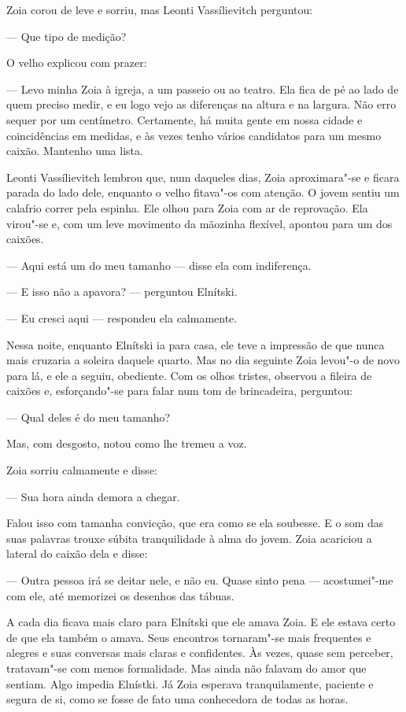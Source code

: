 Zoia corou de leve e sorriu, mas Leonti Vassílievitch perguntou:

--- Que tipo de medição?

O velho explicou com prazer:

--- Levo minha Zoia à igreja, a um passeio ou ao teatro. Ela fica de pé
ao lado de quem preciso medir, e eu logo vejo as diferenças na altura e
na largura. Não erro sequer por um centímetro. Certamente, há muita
gente em nossa cidade e coincidências em medidas, e às vezes tenho
vários candidatos para um mesmo caixão. Mantenho uma lista.

Leonti Vassílievitch lembrou que, num daqueles dias, Zoia aproximara"-se
e ficara parada do lado dele, enquanto o velho fitava"-os com atenção. O
jovem sentiu um calafrio correr pela espinha. Ele olhou para Zoia com ar
de reprovação. Ela virou"-se e, com um leve movimento da mãozinha
flexível, apontou para um dos caixões.

--- Aqui está um do meu tamanho --- disse ela com indiferença.

--- E isso não a apavora? --- perguntou Elnítski.

--- Eu cresci aqui --- respondeu ela calmamente.

Nessa noite, enquanto Elnítski ia para casa, ele teve a impressão de que
nunca mais cruzaria a soleira daquele quarto. Mas no dia seguinte Zoia
levou"-o de novo para lá, e ele a seguiu, obediente. Com os olhos
tristes, observou a fileira de caixões e, esforçando"-se para falar
num tom de brincadeira, perguntou:

--- Qual deles é do meu tamanho?

Mas, com desgosto, notou como lhe tremeu a voz.

Zoia sorriu calmamente e disse:

--- Sua hora ainda demora a chegar.

Falou isso com tamanha convicção, que era como se ela soubesse. E o som
das suas palavras trouxe súbita tranquilidade à alma do jovem. Zoia
acariciou a lateral do caixão dela e disse:

--- Outra pessoa irá se deitar nele, e não eu. Quase sinto pena ---
acostumei"-me com ele, até memorizei os desenhos das tábuas.

A cada dia ficava mais claro para Elnítski que ele amava Zoia. E ele
estava certo de que ela também o amava. Seus encontros tornaram"-se mais
frequentes e alegres e suas conversas mais claras e confidentes. Às
vezes, quase sem perceber, tratavam"-se com menos formalidade. Mas ainda
não falavam do amor que sentiam. Algo impedia Elnístki. Já Zoia esperava
tranquilamente, paciente e segura de si, como se fosse de fato uma
conhecedora de todas as horas.

